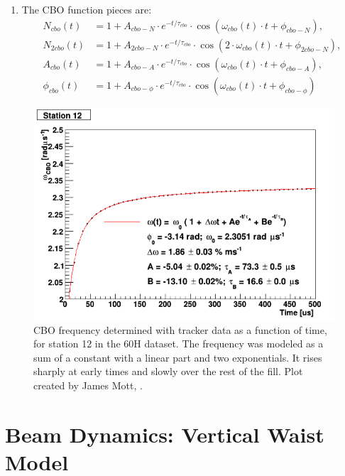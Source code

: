 \begin{enumerate}
		\item{The CBO function pieces are:
			\begin{equation}	
			\begin{aligned}
					N_{cbo}(t) &= 1 + A_{cbo-N} \cdot e^{-t/\tau_{cbo}} \cdot \cos(\omega_{cbo}(t) \cdot t + \phi_{cbo-N}), \\
					N_{2cbo}(t) &= 1 + A_{2cbo-N} \cdot e^{-t/\tau_{cbo}} \cdot \cos(2 \cdot \omega_{cbo}(t) \cdot t + \phi_{2cbo-N}), \\
					A_{cbo}(t) &= 1 + A_{cbo-A} \cdot e^{-t/\tau_{cbo}} \cdot \cos(\omega_{cbo}(t) \cdot t + \phi_{cbo-A}), \\
					\phi_{cbo}(t) &= 1 + A_{cbo-\phi} \cdot e^{-t/\tau_{cbo}} \cdot \cos(\omega_{cbo}(t) \cdot t + \phi_{cbo-\phi})
			\label{eqn:CBO}
			\end{aligned}
			\end{equation}
		}
	\end{enumerate}

	\begin{figure}[]
		\centering
		\includegraphics[width=\textwidth]{TrackerCBOModel}
	    \caption[TrackerCBOModel]{CBO frequency determined with tracker data as a function of time, for station 12 in the 60H dataset. The frequency was modeled as a sum of a constant with a linear part and two exponentials. It rises sharply at early times and slowly over the rest of the fill. Plot created by James Mott, .}
	    \label{fig:TrackerCBOModel}
	\end{figure}

\clearpage

\section{Beam Dynamics: Vertical Waist Model}
\label{Sec:VW}

